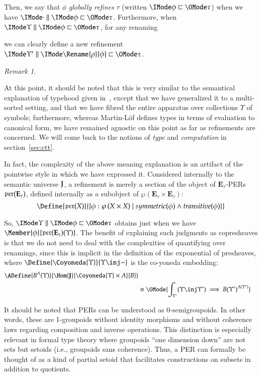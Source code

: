 \documentclass[11pt]{article}
\theoremstyle{definition}
\theoremstyle{notation}
\theoremstyle{remark}
\newtheorem{remark}[thm]{Remark}
\numberwithin{equation}{section}
\newcommand\Pow[1]{\wp\left(#1\right)}
\newcommand\Exprs{\mathbf{E}}
\begin{document}
Then, we say that $\phi$ \emph{globally refines} $\tau$ (written
$\GloballyRefines{\phi}{\tau}$) when we have $\Refines{\cdot}{\phi}{\tau}$.
Furthermore, when $\Refines{\Upsilon}{\phi}{\tau}$, for any renaming
we can clearly define a new refinement $\Refines{\Upsilon'}{\Rename{\rho}{\phi}}{\tau}$.

\begin{remark}\label{rem:internal}

  At this point, it should be noted that this is very similar to the semantical
  explanation of typehood given in~\cite{martin-lof:1979}, except that we have
  generalized it to a multi-sorted setting, and that we have fibred the entire
  apparatus over collections $\Upsilon$ of symbols; furthermore, whereas
  Martin-L\"of defines types in terms of evaluation to canonical form, we have
  remained agnostic on this point as far as refinements are concerned. We will
  come back to the notions of \emph{type} and \emph{computation} in
  section~\ref{sec:ctt}.

  In fact, the complexity of the above meaning explanation is an artifact of
  the pointwise style in which we have expressed it. Considered internally to
  the semantic universe $\mathbf{J}$, a refinement is merely a section of the
  object of $\Exprs_\tau$-PERs $\PERs{\Exprs_\tau}$, defined
  internally as a subobject of $\Pow{\Exprs_\tau\times\Exprs_\tau}$:
  \[
    \Define{
      \PERs{X}
    }{
      \{ \phi : \Pow{X\times X}
         \mid
         symmetric(\phi)
         \land transitive(\phi)
      \}
    }
  \]

  So, $\Refines{\Upsilon}{\phi}{\tau}$ obtains just when we have
  $\Member{\phi}{\PERs{\Exprs_\tau}(\Upsilon)}$. The benefit of explaining such
  judgments as copresheaves is that we do not need to deal with
  the complexities of quantifying over renamings, since this is implicit in the
  definition of the exponential of presheaves, where
  $\Define{\Coyoneda{\Upsilon}}{\Upsilon\inj-}$ is the co-yoneda embedding:
  \begin{align*}
    \ADefine{
      B^A(\Upsilon)
    }{
      \Hom{\SemU}{
        \Coyoneda{\Upsilon}\times A
      }{
        B
      }
    }\\
    &\cong
    \OMode{
      \int_{\Upsilon'}
      (\Upsilon\inj\Upsilon')
      \implies
      {B(\Upsilon')}^{A(\Upsilon')}
    }
  \end{align*}

  It should be noted that PERs can be understood as 0-semigroupoids. In other
  words, these are 1-groupoids without identity morphisms and without coherence
  laws regarding composition and inverse operations. This distinction is
  especially relevant in formal type theory where groupoids ``one dimension
  down'' are not sets but setoids (i.e., groupoids sans coherence). Thus, a PER
  can formally be thought of as a kind of partial setoid that facilitates
  constructions on subsets in addition to quotients. 

\end{remark}
\end{document}
